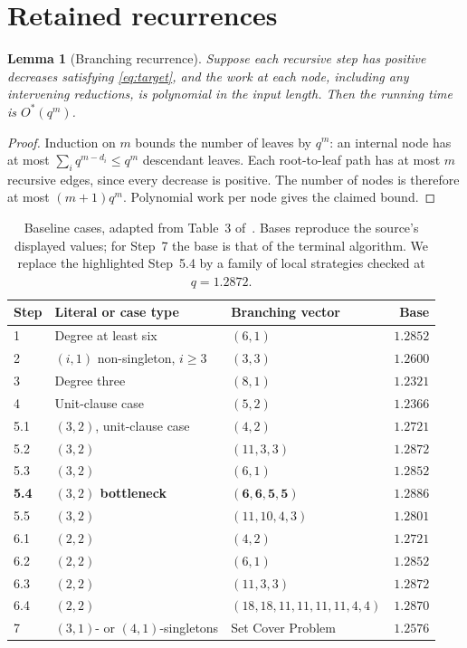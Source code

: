\documentclass[11pt]{article}
\newcommand{\OhStar}{O^*}
\newtheorem{lemma}[theorem]{Lemma}
\theoremstyle{definition}
\theoremstyle{remark}
\begin{document}
\section{Retained recurrences}
\label{app:recurrences}

\begin{lemma}[Branching recurrence]
\label{lem:recurrence}
Suppose each recursive step has positive decreases satisfying
\cref{eq:target}, and the work at each node, including any intervening
reductions, is polynomial in the input length. Then the running time is
$\OhStar(q^m)$.
\end{lemma}
\begin{proof}
Induction on $m$ bounds the number of leaves by $q^m$: an internal node has
at most $\sum_i q^{m-d_i}\le q^m$ descendant leaves. Each root-to-leaf path
has at most $m$ recursive edges, since every decrease is positive. The number
of nodes is therefore at most $(m+1)q^m$. Polynomial work per node gives
the claimed bound.
\end{proof}

\begin{table}[!htbp]
\centering\small
\begin{tabularx}{\linewidth}{@{}lXlr@{}}
\toprule
Step & Literal or case type & Branching vector & Base \\
\midrule
1 & Degree at least six & $(6,1)$ & $1.2852$ \\
2 & $(i,1)$ non-singleton, $i\ge3$ & $(3,3)$ & $1.2600$ \\
3 & Degree three & $(8,1)$ & $1.2321$ \\
4 & Unit-clause case & $(5,2)$ & $1.2366$ \\
5.1 & $(3,2)$, unit-clause case & $(4,2)$ & $1.2721$ \\
5.2 & $(3,2)$ & $(11,3,3)$ & $1.2872$ \\
5.3 & $(3,2)$ & $(6,1)$ & $1.2852$ \\
\textbf{5.4} & \textbf{$(3,2)$ bottleneck} & $\mathbf{(6,6,5,5)}$ & $\mathbf{1.2886}$ \\
5.5 & $(3,2)$ & $(11,10,4,3)$ & $1.2801$ \\
6.1 & $(2,2)$ & $(4,2)$ & $1.2721$ \\
6.2 & $(2,2)$ & $(6,1)$ & $1.2852$ \\
6.3 & $(2,2)$ & $(11,3,3)$ & $1.2872$ \\
6.4 & $(2,2)$ & $(18,18,11,11,11,11,4,4)$ & $1.2870$ \\
7 & $(3,1)$- or $(4,1)$-singletons & Set Cover Problem & $1.2576$ \\
\bottomrule
\end{tabularx}
\caption{Baseline cases, adapted from Table~3 of~\cite{Xiao2022}.
Bases reproduce the source's displayed values; for Step~7 the base is
that of the terminal algorithm. We replace the highlighted Step~5.4 by
a family of local strategies checked at $q=1.2872$.}
\label{tab:global-vectors}
\end{table}
\end{document}
